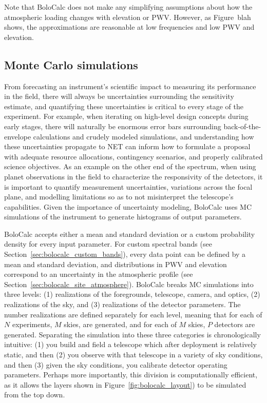 Note that BoloCalc does not make any simplifying assumptions about how the atmospheric loading changes with elevation or PWV. However, as Figure~blah shows, the approximations are reasonable at low frequencies and low PWV and elevation. 


\subsection{Monte Carlo simulations}
\label{sec:bolocalc_monte_carlo}

From forecasting an instrument's scientific impact to measuring its performance in the field, there will always be uncertainties surrounding the sensitivity estimate, and quantifying these uncertainties is critical to every stage of the experiment. For example, when iterating on high-level design concepts during early stages, there will naturally be enormous error bars surrounding back-of-the-envelope calculations and crudely modeled simulations, and understanding how these uncertainties propagate to NET can inform how to formulate a proposal with adequate resource allocations, contingency scenarios, and properly calibrated science objectives. As an example on the other end of the spectrum, when using planet observations in the field to characterize the responsivity of the detectors, it is important to quantify measurement uncertainties, variations across the focal plane, and modelling limitations so as to not misinterpret the telescope's capabilities. Given the importance of uncertainty modeling, BoloCalc uses MC simulations of the instrument to generate histograms of output parameters.

BoloCalc accepts either a mean and standard deviation or a custom probability density for every input parameter. For custom spectral bands (see Section~\ref{sec:bolocalc_custom_bands}), every data point can be defined by a mean and standard deviation, and distributions in PWV and elevation correspond to an uncertainty in the atmospheric profile (see Section~\ref{sec:bolocalc_site_atmosphere}). BoloCalc breaks MC simulations into three levels: (1) realizations of the foregrounds, telescope, camera, and optics, (2) realizations of the sky, and (3) realizations of the detector parameters. The number realizations are defined separately for each level, meaning that for each of $N$ experiments, $M$ skies, are generated, and for each of $M$ skies, $P$ detectors are generated. Separating the simulation into these three categories is chronologically intuitive: (1) you build and field a telescope which after deployment is relatively static, and then (2) you observe with that telescope in a variety of sky conditions, and then (3) given the sky conditions, you calibrate detector operating parameters. Perhaps more importantly, this division is computationally efficient, as it allows the layers shown in Figure~\ref{fig:bolocalc_layout}) to be simulated from the top down.

